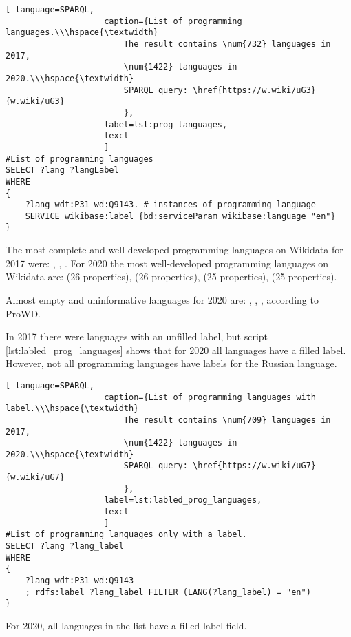 \begin{lstlisting}[ language=SPARQL, 
                    caption={List of programming languages.\\\hspace{\textwidth}
                        The result contains \num{732} languages in 2017, 
                        \num{1422} languages in 2020.\\\hspace{\textwidth}
                        SPARQL query: \href{https://w.wiki/uG3}{w.wiki/uG3}
                        },
                    label=lst:prog_languages,
                    texcl 
                    ]
#List of programming languages
SELECT ?lang ?langLabel
WHERE
{
    ?lang wdt:P31 wd:Q9143. # instances of programming language
    SERVICE wikibase:label {bd:serviceParam wikibase:language "en"}
}
\end{lstlisting}%

The most complete and well-developed programming languages on Wikidata for 2017 were: , , . For 2020 the most well-developed programming languages on Wikidata are:  (26 properties),  (26 properties),  (25 properties),  (25 properties).

Almost empty and uninformative languages for 2020 are: , , ,  according to ProWD.

In 2017 there were languages with an unfilled label, but script \ref{lst:labled_prog_languages} shows that for 2020 all languages have a filled label. However, not all programming languages have labels for the Russian language.

\begin{lstlisting}[ language=SPARQL, 
                    caption={List of programming languages with label.\\\hspace{\textwidth}
                        The result contains \num{709} languages in 2017, 
                        \num{1422} languages in 2020.\\\hspace{\textwidth}
                        SPARQL query: \href{https://w.wiki/uG7}{w.wiki/uG7}
                        },
                    label=lst:labled_prog_languages,
                    texcl 
                    ]
#List of programming languages only with a label.
SELECT ?lang ?lang_label
WHERE
{
    ?lang wdt:P31 wd:Q9143
    ; rdfs:label ?lang_label FILTER (LANG(?lang_label) = "en") 
}
\end{lstlisting}%
For 2020, all languages in the list have a filled label field.

